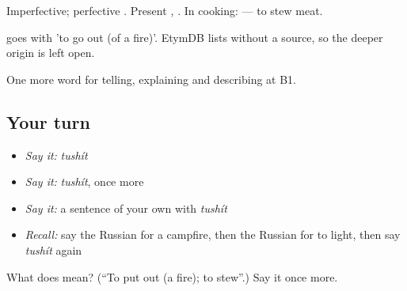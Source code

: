 Imperfective; perfective \emph{}. Present \emph{, }. In cooking: \emph{ } — to stew meat.

\begin{cousinweb}
\emph{} goes with \emph{} 'to go out (of a fire)'. EtymDB lists \emph{} without a source, so the deeper origin is left open.
\end{cousinweb}

\begin{grammarlens}[title={What you've built}]
One more word for telling, explaining and describing at B1.
\end{grammarlens}

\subsection*{Your turn}
\begin{itemize}
\raggedright
  \item \emph{Say it:} \emph{tushít}
  \item \emph{Say it:} \emph{tushít}, once more
  \item \emph{Say it:} a sentence of your own with \emph{tushít}
  \item \emph{Recall:} say the Russian for a campfire, then the Russian for to light, then say \emph{tushít} again
\end{itemize}

\begin{tcolorbox}[breakable,colback=teal!4,colframe=teal!35!black,title={Before you move on}]
What does  mean? (\textquotedblleft{}To put out (a fire); to stew\textquotedblright{}.) Say it once more.
\end{tcolorbox}
